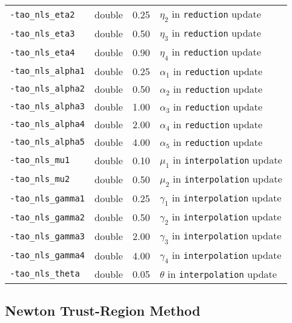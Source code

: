 \begin{table}[h]
\begin{tabular}{l|p{1.5in}|l|p{2.0in}}
{\tt -tao\_nls\_eta2} & double & 0.25 & $\eta_2$ in {\tt reduction} update \\
{\tt -tao\_nls\_eta3} & double & 0.50 & $\eta_3$ in {\tt reduction} update \\
{\tt -tao\_nls\_eta4} & double & 0.90 & $\eta_4$ in {\tt reduction} update \\
{\tt -tao\_nls\_alpha1} & double & 0.25 & $\alpha_1$ in {\tt reduction} update \\
{\tt -tao\_nls\_alpha2} & double & 0.50 & $\alpha_2$ in {\tt reduction} update \\
{\tt -tao\_nls\_alpha3} & double & 1.00 & $\alpha_3$ in {\tt reduction} update \\
{\tt -tao\_nls\_alpha4} & double & 2.00 & $\alpha_4$ in {\tt reduction} update \\
{\tt -tao\_nls\_alpha5} & double & 4.00 & $\alpha_5$ in {\tt reduction} update \\
{\tt -tao\_nls\_mu1} & double & 0.10 & $\mu_1$ in {\tt interpolation} update \\
{\tt -tao\_nls\_mu2} & double & 0.50 & $\mu_2$ in {\tt interpolation} update \\
{\tt -tao\_nls\_gamma1} & double & 0.25 & $\gamma_1$ in {\tt interpolation} update \\
{\tt -tao\_nls\_gamma2} & double & 0.50 & $\gamma_2$ in {\tt interpolation} update \\
{\tt -tao\_nls\_gamma3} & double & 2.00 & $\gamma_3$ in {\tt interpolation} update \\
{\tt -tao\_nls\_gamma4} & double & 4.00 & $\gamma_4$ in {\tt interpolation} update \\
{\tt -tao\_nls\_theta} & double & 0.05 & $\theta$ in {\tt interpolation} update \\
\end{tabular}
\end{table}

\subsection{Newton Trust-Region Method}

